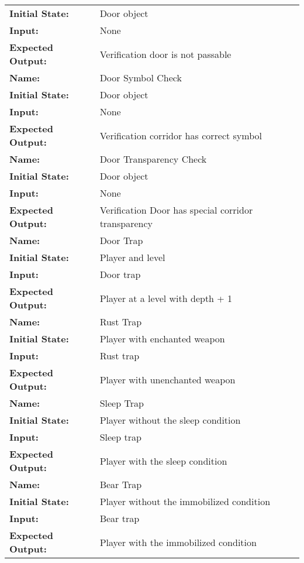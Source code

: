 \documentclass[12pt, titlepage]{article}
\begin{document}
\begin{center}
\begin{longtable}{ l | p{10cm} }
				\textbf{Initial State:} & Door object\\
				\textbf{Input:} & None\\
				\textbf{Expected Output:} & Verification door is not passable\\[0.6em]
				\hline
				\rule{0pt}{1.5em}\textbf{Name:} & Door Symbol Check\\
				\textbf{Initial State:} & Door object\\
				\textbf{Input:} & None\\
				\textbf{Expected Output:} & Verification corridor has correct symbol\\[0.6em]
				\hline
				\rule{0pt}{1.5em}\textbf{Name:} & Door Transparency Check\\
				\textbf{Initial State:} & Door object\\
				\textbf{Input:} & None\\
				\textbf{Expected Output:} & Verification Door has special corridor transparency\\[0.6em]
				\hline
				\rule{0pt}{1.5em}\textbf{Name:} & Door Trap\\
				\textbf{Initial State:} & Player and level\\
				\textbf{Input:} & Door trap\\
				\textbf{Expected Output:} & Player at a level with depth + 1\\[0.6em]
				\hline
				\rule{0pt}{1.5em}\textbf{Name:} & Rust Trap\\
				\textbf{Initial State:} & Player with enchanted weapon\\
				\textbf{Input:} & Rust trap\\
				\textbf{Expected Output:} & Player with unenchanted weapon\\[0.6em]
				\hline
				\rule{0pt}{1.5em}\textbf{Name:} & Sleep Trap\\
				\textbf{Initial State:} & Player without the sleep condition\\
				\textbf{Input:} & Sleep trap\\
				\textbf{Expected Output:} & Player with the sleep condition\\[0.6em]
				\hline
				\rule{0pt}{1.5em}\textbf{Name:} & Bear Trap\\
				\textbf{Initial State:} & Player without the immobilized condition\\
				\textbf{Input:} & Bear trap\\
				\textbf{Expected Output:} & Player with the immobilized condition\\[0.6em]

\end{longtable}
\end{center}
\end{document}
